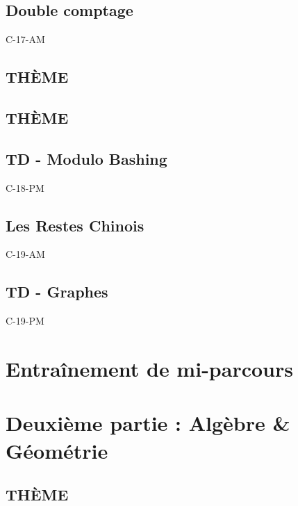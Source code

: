 \documentclass[poly,trombi]{valbonne}
\begin{document}
\subsection{Double comptage}

{C-17-AM}

\subsection{THÈME}


\subsection{THÈME}


\subsection{TD - Modulo Bashing}

{C-18-PM}

\subsection{Les Restes Chinois}

{C-19-AM}

\subsection{TD - Graphes}

{C-19-PM}


\section{Entraînement de mi-parcours}



\section{Deuxième partie : Algèbre \& Géométrie}

\subsection{THÈME}
\end{document}
